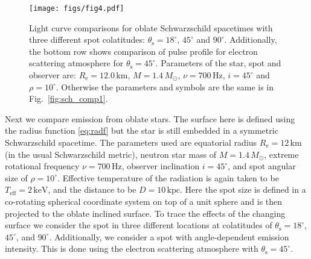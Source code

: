 \documentclass{aa}
\newcommand{\refe}[1]{#1}
\newcommand{\sch}{Schwarzschild }
\newcommand{\Msun}{\ensuremath{M_{\odot}}}
\begin{document}
\begin{figure}
\centering
\texttt{[image: figs/fig4.pdf]}
\caption{\label{fig:osch_comp700}
  Light curve comparisons for oblate \sch spacetimes with three different spot colatitudes: $\theta_{\mathrm{s}} = 18^{\circ}$, $45^{\circ}$ and $90^{\circ}$.
  Additionally, the bottom row shows comparison of pulse profile for electron scattering atmosphere for $\theta_{\mathrm{s}} = 45^{\circ}$.
  Parameters of the star, spot and observer are: $R_{\mathrm{e}} = 12.0\,\mathrm{km}$, $M = 1.4\,\Msun$, $\nu = 700\,\mathrm{Hz}$, $i = 45^{\circ}$ and $\rho = 10^{\circ}$.
  Otherwise the parameters and symbols are the same is in Fig.~\ref{fig:sch_comp1}.
  }
\end{figure}

Next we compare emission from oblate stars.
The surface here is defined using the radius function \eqref{eq:radf} but the star is still embedded in a symmetric \sch spacetime.
The parameters used are equatorial radius $R_{\mathrm{e}} = 12\,\mathrm{km}$ (in the usual \sch metric), neutron star mass of $M = 1.4\,\Msun$, extreme rotational frequency $\nu = 700\,\mathrm{Hz}$, observer inclination $i=45^{\circ}$, and spot angular size of $\rho = 10^{\circ}$.
Effective temperature of the radiation is again taken to be $T_{\mathrm{eff}} = 2\,\mathrm{keV}$, and the distance to be $D = 10\,\mathrm{kpc}$.
Here the spot size is defined in a \refe{co-rotating} spherical coordinate system on top of a unit sphere and is then projected to the oblate inclined surface.
To trace the effects of the changing surface we consider the spot in three different locations at colatitudes of $\theta_{\mathrm{s}} = 18^{\circ}$, $45^{\circ}$, and $90^{\circ}$.
Additionally, we consider a spot with angle-dependent emission intensity.
This is done using the electron scattering atmosphere with $\theta_{\mathrm{s}} = 45^{\circ}$.
\end{document}
